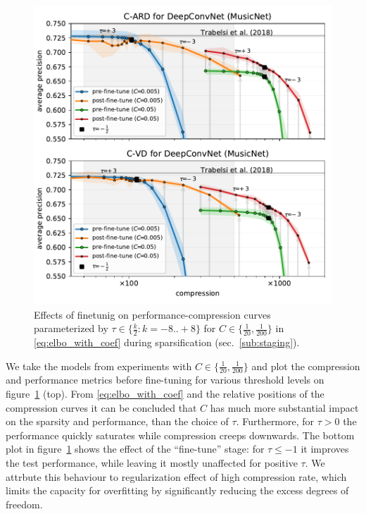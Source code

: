 \documentclass[a4paper,10pt,twocolumn]{article}
\begin{document}
\begin{figure}[!t]
  \centering
  \includegraphics[width=1\columnwidth]{figure__musicnet__threshold__C__DeepConvNet.pdf}
  \caption{%
    Effects of finetunig on performance-compression curves parameterized by $
      \tau\in \{\tfrac{k}2\colon k=-8..+8 \}
    $ for $
      C\in \{\tfrac1{20}, \frac1{200}\}
    $ in \eqref{eq:elbo_with_coef} during sparsification (sec.~\ref{sub:staging}).
  }
  \label{fig:hist__and__threshold__tradeoff}
\end{figure}

We take the models from experiments with $C \in \{\tfrac1{20}, \frac1{200}\}$ and plot
the compression and performance metrics before fine-tuning for various threshold levels
on figure~\ref{fig:hist__and__threshold__tradeoff} (top). From \eqref{eq:elbo_with_coef} and
the relative positions of the compression curves it can be concluded that $C$ has much
more substantial impact on the sparsity and performance, than the choice of $\tau$.
Furthermore, for $\tau > 0$ the performance quickly saturates while compression creeps
downwards.
%
The bottom plot in figure~\ref{fig:hist__and__threshold__tradeoff} shows the effect of
the ``fine-tune'' stage: for $\tau \leq -1$ it improves the test performance, while leaving
it mostly unaffected for positive $\tau$. We attrbute this behaviour to regularization
effect of high compression rate, which limits the capacity for overfitting by significantly
reducing the excess degrees of freedom.
\end{document}
